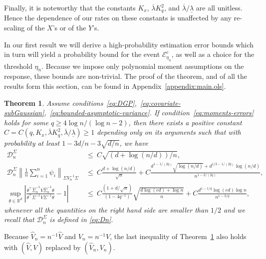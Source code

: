 \documentclass{article}
\newtheorem{theorem}{Theorem}
\begin{document}
 Finally, it is noteworthy that the constants $K_x$, $\overline{\lambda} K_q^2$, and $\overline{\lambda}/\underline{\lambda}$ are all unitless. Hence the dependence of our rates on these constants is unaffected by any re-scaling of the $X$'s or of the $Y$'s. 
 
 
 
 
 
 
 In our first result we will derive a high-probability estimation error bounds which in turn will yield a probability bound for the event $\mathcal{E}^c_{\eta_n}$, as well as a choice for the threshold $\eta_n$. Because we impose only polynomial moment assumptions on the response, these bounds are non-trivial. The proof of the theorem, and of all the results form this section, can be found  in Appendix~\ref{appendix:main.ols}.  
 
 \begin{theorem}\label{thm:main-rates-thm-OLS-independence}
 Assume conditions~\ref{eq:DGP},~\ref{eq:covariate-subGaussian},~\ref{eq:bounded-asymptotic-variance}. If condition~\ref{eq:moments-errors} holds for some $q \ge 4\log n/(\log n - 2)$, then there exists a positive constant $C = C(q, K_x, \overline{\lambda} K_q^2, \overline{\lambda}/\underline{\lambda}) \ge 1$ depending only on its arguments such that with probability at least $1 - 3d/n - 3\sqrt{d/n}$, we have
 \begin{equation}\label{eq:main-quantity-bounds}
 \begin{split}
 \mathcal{D}_n^{\Sigma} ~&\le~ C\sqrt{(d + \log(n/d))/n},\\
 \mathcal{D}_n^{\Sigma}\left\|\frac{1}{n}\sum_{i=1}^n \psi_i\right\|_{\Sigma V_n^{-1}\Sigma} ~&\le~ C\frac{d + \log(n/d)}{\sqrt{n}}
 + C\frac{d^{1-1/(2q)}\sqrt{\log(n/d)} + d^{1/2 - 1/(2q)}\log(n/d)}{n^{1-3/(2q)}},\\
 \sup_{\theta\in\mathbb{R}^d}\left|\frac{\theta^{\top}\widehat{\Sigma}^{-1}_n\widehat{V}\widehat{\Sigma}_n^{-1}\theta}{\theta^{\top}\Sigma^{-1}V\Sigma^{-1}\theta} - 1\right| ~&\le~ C\frac{(1 + d/\sqrt{n})}{(1-4q^{-1})}\sqrt{\frac{d\log(ed) + \log n}{n}}
 
 + C\frac{d^{1-1/q}\log(ed)\log n}{n^{1-3/q}},
 \end{split}
 \end{equation} 
 whenever all the quantities on the right hand side are smaller than $1/2$ and we recall that $\mathcal{D}_n^{\Sigma}$ is defined in \eqref{eq:Dn}. 
 \end{theorem}
 Because $\widehat{V}_n = n^{-1}\widehat{V}$ and $V_n = n^{-1}V$, the last inequality of Theorem~\ref{thm:main-rates-thm-OLS-independence} also holds with $(\widehat{V}, V)$ replaced by $(\widehat{V}_n, V_n)$.
 
\end{document}

